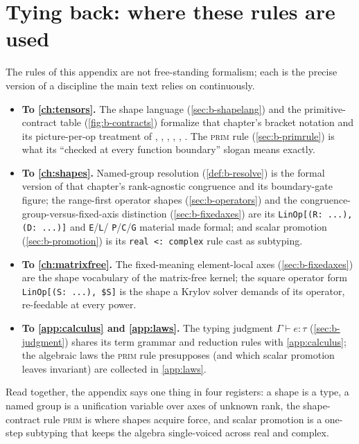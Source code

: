 \section{Tying back: where these rules are used}
\label{sec:b-tieback}

The rules of this appendix are not free-standing formalism; each is the precise
version of a discipline the main text relies on continuously.

\begin{itemize}[leftmargin=1.4em, nosep]
\item \textbf{To \cref{ch:tensors}.} The shape language (\cref{sec:b-shapelang})
and the primitive-contract table (\cref{fig:b-contracts}) formalize that chapter's
bracket notation and its picture-per-op treatment of , ,
, , , . The \textsc{prim}
rule (\cref{sec:b-primrule}) is what its ``checked at every function boundary''
slogan means exactly.
\item \textbf{To \cref{ch:shapes}.} Named-group resolution (\cref{def:b-resolve})
is the formal version of that chapter's rank-agnostic congruence and its
boundary-gate figure; the range-first operator shapes (\cref{sec:b-operators}) and
the congruence-group-versus-fixed-axis distinction (\cref{sec:b-fixedaxes}) are its
\lstinline[style=l4style]|LinOp[(R: ...), (D: ...)]| and \texttt{E}/\texttt{L}/%
\texttt{P}/\texttt{C}/\texttt{G} material made formal; and scalar promotion
(\cref{sec:b-promotion}) is its \lstinline[style=l4style]!real <: complex! rule
cast as subtyping.
\item \textbf{To \cref{ch:matrixfree}.} The fixed-meaning element-local axes
(\cref{sec:b-fixedaxes}) are the shape vocabulary of the matrix-free kernel; the
square operator form \lstinline[style=l4style]|LinOp[(S: ...), $S]| is the shape a
Krylov solver demands of its operator, re-feedable at every power.
\item \textbf{To \cref{app:calculus} and \cref{app:laws}.} The typing judgment
$\Gamma \vdash e : \tau$ (\cref{sec:b-judgment}) shares its term grammar and
reduction rules with \cref{app:calculus}; the algebraic laws the \textsc{prim} rule
presupposes (and which scalar promotion leaves invariant) are collected in
\cref{app:laws}.
\end{itemize}

Read together, the appendix says one thing in four registers: a shape is a type, a
named group is a unification variable over axes of unknown rank, the
shape-contract rule \textsc{prim} is where shapes acquire force, and scalar
promotion is a one-step subtyping that keeps the algebra single-voiced across real
and complex.

